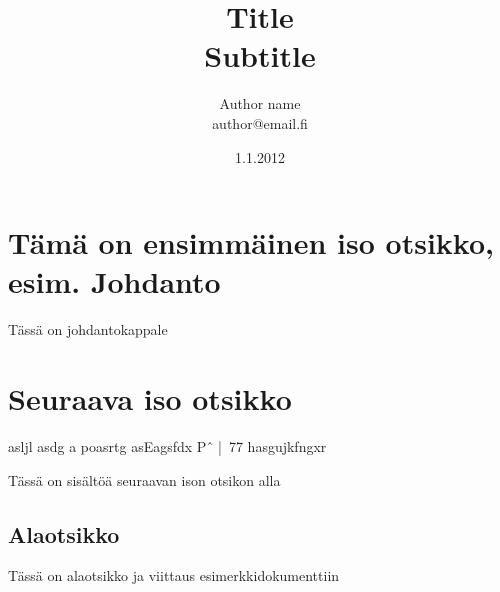 \documentclass[a4paper]{article}
\begin{document}
\title{\huge Title \\ \large Subtitle}
\date{1.1.2012}
\author{Author name \\ author@email.fi}
\maketitle

\large

\section{Tämä on ensimmäinen iso otsikko, esim. Johdanto}

Tässä on johdantokappale

\section{Seuraava iso otsikko}

\alsjg  asljl asdg
a poasrtg 
asEagsfdx
Pˆ |\ 77 hasgujkfngxr

Tässä on sisältöä seuraavan ison otsikon alla

\subsection{Alaotsikko}

Tässä on alaotsikko ja viittaus esimerkkidokumenttiin \citep{koski2012}




\end{document}
